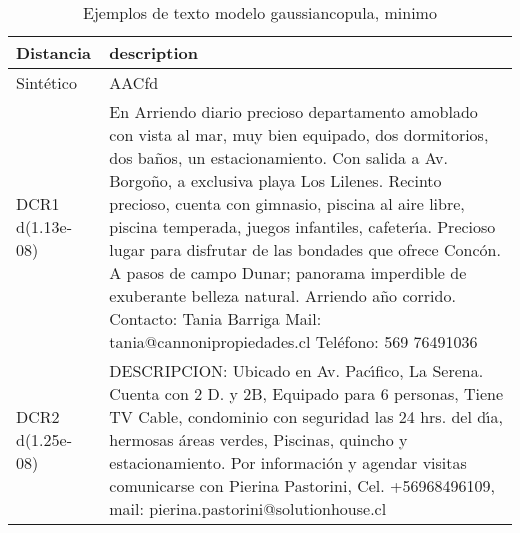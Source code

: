 \begin{table}[H]
\centering
\fontsize{10}{14}\selectfont
\caption{Ejemplos de texto modelo gaussiancopula, minimo}
\label{table-example-economicos-a-2-gaussiancopula-min-text}
\begin{tabular}{|l|m{35em}|}
\hline
\rowcolor[gray]{0.8}
Distancia & description \\
\hline Sintético & AACfd \\
\hline DCR1 d(1.13e-08) & En Arriendo diario precioso departamento amoblado con vista al mar, muy bien equipado, dos dormitorios, dos ba\~nos, un estacionamiento. Con salida a Av. Borgo\~no, a exclusiva playa Los Lilenes. Recinto precioso, cuenta con gimnasio, piscina al aire libre, piscina temperada, juegos infantiles, cafeter{\'\i}a. Precioso lugar para disfrutar de las bondades que ofrece Conc\'on. A pasos de campo Dunar; panorama imperdible de exuberante belleza natural. Arriendo a\~no corrido.  Contacto: Tania Barriga Mail: tania@cannonipropiedades.cl Tel\'efono: 569 76491036 \\
\hline DCR2 d(1.25e-08) & DESCRIPCION: Ubicado en Av. Pac{\'\i}fico, La Serena. Cuenta con 2 D. y 2B, Equipado para 6 personas, Tiene TV Cable, condominio con seguridad las 24 hrs. del d{\'\i}a, hermosas \'areas verdes, Piscinas, quincho y estacionamiento.  Por informaci\'on y agendar visitas comunicarse con Pierina Pastorini, Cel. +56968496109, mail: pierina.pastorini@solutionhouse.cl \\
\hline
\end{tabular}
\end{table}
